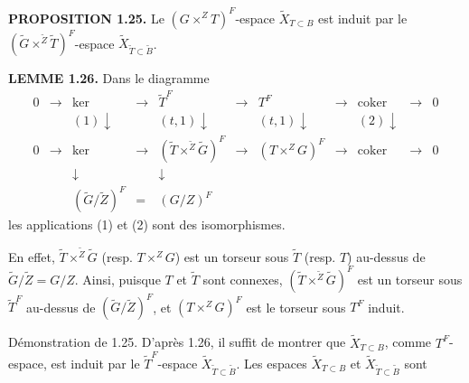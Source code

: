 \documentclass[9pt,twoside]{extarticle}
\begin{document}
{\noindent\textbf{PROPOSITION 1.25.} Le \((G\times^Z T)^F\)-espace \(\widetilde X_{T\subset B}\) est induit par le \((\widetilde G\times^{\widetilde Z}\widetilde T)^F\)-espace \(\widetilde X_{\widetilde T\subset\widetilde B}\).\par

\noindent\textbf{LEMME 1.26.} Dans le diagramme \[
\begin{array}{ccccccccccc}
0&\longrightarrow&\ker&\longrightarrow&\widetilde T^F&\longrightarrow&T^F&\longrightarrow&\operatorname{coker}&\longrightarrow&0\\
&&{\scriptstyle(1)}\downarrow&&{\scriptstyle(t,1)}\downarrow&&{\scriptstyle(t,1)}\downarrow&&{\scriptstyle(2)}\downarrow&&\\
0&\longrightarrow&\ker&\longrightarrow&(\widetilde T\times^{\widetilde Z}\widetilde G)^F&\longrightarrow&(T\times^Z G)^F&\longrightarrow&\operatorname{coker}&\longrightarrow&0\\
&&\downarrow&&\downarrow&&&&&&\\
&&(\widetilde G/\widetilde Z)^F&=&(G/Z)^F&&&&&&
\end{array}
\] les applications (1) et (2) sont des isomorphismes.\par

En effet, \(\widetilde T\times^{\widetilde Z}\widetilde G\) (resp. \(T\times^Z G\)) est un torseur sous \(\widetilde T\) (resp. \(T\)) au-dessus de \(\widetilde G/\widetilde Z=G/Z\). Ainsi, puisque \(T\) et \(\widetilde T\) sont connexes, \((\widetilde T\times^{\widetilde Z}\widetilde G)^F\) est un torseur sous \(\widetilde T^F\) au-dessus de \((\widetilde G/\widetilde Z)^F\), et \((T\times^Z G)^F\) est le torseur sous \(T^F\) induit.\par

Démonstration de 1.25. D'après 1.26, il suffit de montrer que \(\widetilde X_{T\subset B}\), comme \(T^F\)-espace, est induit par le \(\widetilde T^F\)-espace \(\widetilde X_{\widetilde T\subset\widetilde B}\). Les espaces \(\widetilde X_{T\subset B}\) et \(\widetilde X_{\widetilde T\subset\widetilde B}\) sont\par
}
\end{document}
